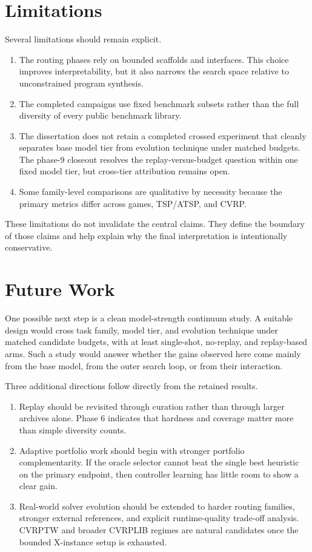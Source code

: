 \section{Limitations}
\label{sec:conclusion-limitations}

Several limitations should remain explicit.

\begin{enumerate}[leftmargin=2em]
\item The routing phases rely on bounded scaffolds and interfaces. This choice improves
interpretability, but it also narrows the search space relative to unconstrained program synthesis.
\item The completed campaigns use fixed benchmark subsets rather than the full diversity of every
public benchmark library.
\item The dissertation does not retain a completed crossed experiment that cleanly separates base
model tier from evolution technique under matched budgets. The phase-9 closeout resolves the
replay-versus-budget question within one fixed model tier, but cross-tier attribution remains open.
\item Some family-level comparisons are qualitative by necessity because the primary metrics differ
across games, TSP/ATSP, and CVRP.
\end{enumerate}

These limitations do not invalidate the central claims. They define the boundary of those claims
and help explain why the final interpretation is intentionally conservative.

\section{Future Work}
\label{sec:conclusion-future-work}

One possible next step is a clean model-strength continuum study. A suitable design would cross task
family, model tier, and evolution technique under matched candidate budgets, with at least
single-shot, no-replay, and replay-based arms. Such a study would answer whether the gains
observed here come mainly from the base model, from the outer search loop, or from their
interaction.

Three additional directions follow directly from the retained results.

\begin{enumerate}[leftmargin=2em]
\item Replay should be revisited through curation rather than through larger archives alone. Phase 6
indicates that hardness and coverage matter more than simple diversity counts.
\item Adaptive portfolio work should begin with stronger portfolio complementarity. If the oracle
selector cannot beat the single best heuristic on the primary endpoint, then controller learning has
little room to show a clear gain.
\item Real-world solver evolution should be extended to harder routing families, stronger external
references, and explicit runtime-quality trade-off analysis. CVRPTW and broader CVRPLIB regimes are
natural candidates once the bounded X-instance setup is exhausted.
\end{enumerate}

